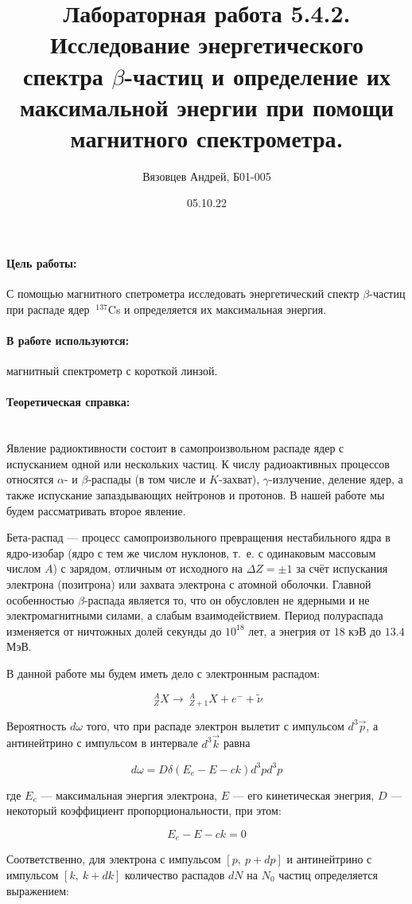 \documentclass[a4paper, 12pt]{article}
\author{Вязовцев Андрей, Б01-005}
\date{05.10.22}
\title{Лабораторная работа 5.4.2. Исследование энергетического спектра $\beta$-частиц и определение их максимальной энергии при помощи магнитного спектрометра.}
\newcommand{\parag}[1]{\paragraph*{#1:}}
\begin{document}
\maketitle

\parag {Цель работы} С помощью магнитного спетрометра исследовать энергетический спектр $\beta$-частиц при распаде ядер $~^{137}$Cs и определяется их максимальная энергия.

\parag {В работе используются} магнитный спектрометр с короткой линзой.

\parag {Теоретическая справка} ~\\

Явление радиоктивности состоит в самопроизвольном распаде ядер с испусканием одной или нескольких частиц. К числу радиоактивных процессов относятся $\alpha$- и $\beta$-распады (в том числе и $K$-захват), $\gamma$-излучение, деление ядер, а также испускание запаздывающих нейтронов и протонов. В нашей работе мы будем рассматривать второе явление.

Бета-распад --- процесс самопроизвольного превращения нестабильного ядра в ядро-изобар (ядро с тем же числом нуклонов, т.~е. с одинаковым массовым числом $A$) с зарядом, отличным от исходного на $\Delta Z = \pm 1$ за счёт испускания электрона (позитрона) или захвата электрона с атомной оболочки. Главной особенностью $\beta$-распада является то, что он обусловлен не ядерными и не электромагнитными силами, а слабым взаимодействием. Период полураспада изменяется от ничтожных долей секунды до $10^{18}$ лет, а энегрия от $18$ кэВ до $13.4$ МэВ.

В данной работе мы будем иметь дело с электронным распадом:

\[
    ~^A_Z X \rightarrow ~^A_{Z+1} X + e^- + \tilde{\nu}
\]

Вероятность $d\omega$ того, что при распаде электрон вылетит с импульсом $d^3\vec{p}$, а антинейтрино с импульсом в интервале $d^3\vec{k}$ равна

\begin{equation}
    d\omega = D \delta (E_e - E - ck) d^3p d^3p
\end{equation}

где $E_e$ --- максимальная энергия электрона, $E$ --- его кинетическая энегрия, $D$ --- некоторый коэффициент пропорциональности, при этом:

\begin{equation}
    E_e - E - ck = 0
\end{equation}

Соответственно, для электрона с импульсом $[p, ~p+dp]$ и антинейтрино с импульсом $[k, ~k+dk]$ количество распадов $dN$ на $N_0$ частиц определяется выражением:
\end{document}
